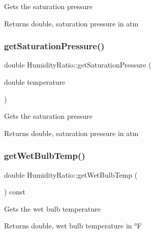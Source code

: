 Gets the saturation pressure

\begin{DoxyReturn}{Returns}
double, saturation pressure in atm 
\end{DoxyReturn}
\mbox{\label{class_humidity_ratio_a29d3152c2f14fd47f9ee34c0787049cf}} 
\subsubsection{\texorpdfstring{get\+Saturation\+Pressure()}{getSaturationPressure()}\hspace{0.1cm}{\footnotesize\ttfamily [3/3]}}
{\footnotesize\ttfamily double Humidity\+Ratio\+::get\+Saturation\+Pressure (\begin{DoxyParamCaption}\item[{double}]{temperature }\end{DoxyParamCaption})}

Gets the saturation pressure

\begin{DoxyReturn}{Returns}
double, saturation pressure in atm 
\end{DoxyReturn}
\mbox{\label{class_humidity_ratio_adbadf93878e4867ce283319859d04087}} 
\subsubsection{\texorpdfstring{get\+Wet\+Bulb\+Temp()}{getWetBulbTemp()}\hspace{0.1cm}{\footnotesize\ttfamily [1/3]}}
{\footnotesize\ttfamily double Humidity\+Ratio\+::get\+Wet\+Bulb\+Temp (\begin{DoxyParamCaption}{ }\end{DoxyParamCaption}) const\hspace{0.3cm}{\ttfamily [inline]}}

Gets the wet bulb temperature

\begin{DoxyReturn}{Returns}
double, wet bulb temperature in °F 
\end{DoxyReturn}


